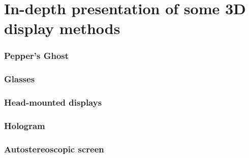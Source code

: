 \section{In-depth presentation of some 3D display methods}
\subsubsection{Pepper's Ghost}
\subsubsection{Glasses}
\subsubsection{Head-mounted displays}
\subsubsection{Hologram}
\subsubsection{Autostereoscopic screen}
